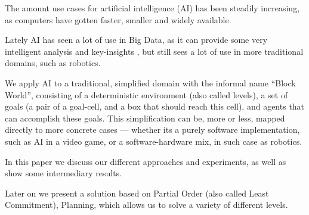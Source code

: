 \documentclass[Main]{subfiles}
\begin{document}
The amount use cases for artificial intelligence (AI) has been steadily increasing, as computers have gotten faster, smaller and widely available.\citep{barrons2013}\citep{poynter2014}\citep{sabhnaniai}

Lately AI has seen a lot of use in Big Data, as it can provide some very intelligent analysis and key-insights \citep{OLeary2013},
but still sees a lot of use in more traditional domains, such as robotics.

We apply AI to a traditional, simplified domain with the informal name ``Block World'', consisting of a deterministic environment (also called levels), a set of goals (a pair of a goal-cell, and a box that should reach this cell), and agents that can accomplish these goals.
This simplification can be, more or less, mapped directly to more concrete cases --- 
whether its a purely software implementation, such as AI in a video game, or a software-hardware mix, in such case as robotics.

In this paper we discuss our different approaches and experiments, as well as show some intermediary results.

Later on we present a solution based on Partial Order (also called Least Commitment), Planning, 
which allows us to solve a variety of different levels. 
\end{document}
